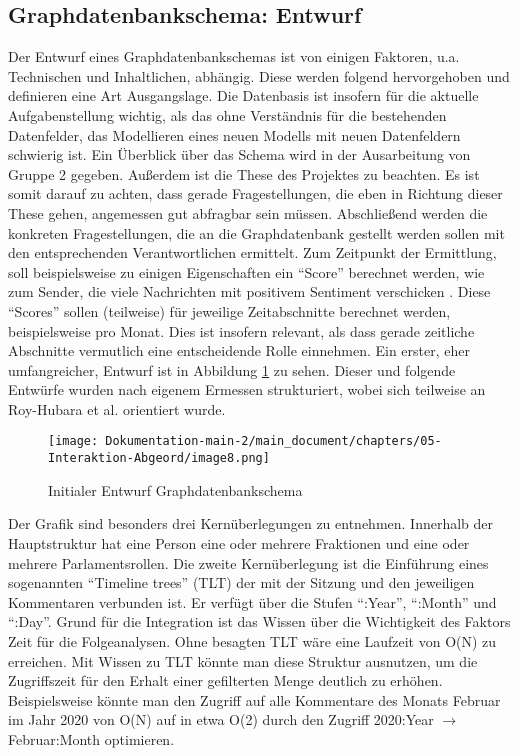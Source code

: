\subsection{Graphdatenbankschema: Entwurf}
Der Entwurf eines Graphdatenbankschemas ist von einigen Faktoren, u.a. Technischen und Inhaltlichen, abhängig. Diese werden folgend hervorgehoben und definieren eine Art Ausgangslage.
\newline
Die Datenbasis ist insofern für die aktuelle Aufgabenstellung wichtig, als das ohne Verständnis für die bestehenden Datenfelder, das Modellieren eines neuen Modells mit neuen Datenfeldern schwierig ist. Ein Überblick über das Schema wird in der Ausarbeitung von Gruppe 2 gegeben.
Außerdem ist die These des Projektes zu beachten. Es ist somit darauf zu achten, dass gerade Fragestellungen, die eben in Richtung dieser These gehen, angemessen gut abfragbar sein müssen.
\newline
Abschließend werden die konkreten Fragestellungen, die an die Graphdatenbank gestellt werden sollen mit den entsprechenden Verantwortlichen ermittelt. Zum Zeitpunkt der Ermittlung, soll beispielsweise zu einigen Eigenschaften ein \enquote{Score} berechnet werden, wie zum Sender, die viele Nachrichten mit positivem Sentiment verschicken \cite{initialQuestionsGroup7}. Diese \enquote{Scores} sollen (teilweise) für jeweilige Zeitabschnitte berechnet werden, beispielsweise pro Monat. Dies ist insofern relevant, als dass gerade zeitliche Abschnitte vermutlich eine entscheidende Rolle einnehmen.
\newline
Ein erster, eher umfangreicher, Entwurf ist in Abbildung \ref{fig:Dokumentation-main-2/muster_for_teams/chapters/04-Abgeordnete/image8.png} zu sehen. Dieser und folgende Entwürfe wurden nach eigenem Ermessen strukturiert, wobei sich teilweise an Roy-Hubara et al. \cite{graphdatabasemodelling} orientiert wurde.
\begin{figure}[hbt!]
    \centering
    \texttt{[image: Dokumentation-main-2/main\_document/chapters/05-Interaktion-Abgeord/image8.png]}
    \caption{Initialer Entwurf Graphdatenbankschema}
    \label{fig:Dokumentation-main-2/muster_for_teams/chapters/04-Abgeordnete/image8.png}
\end{figure}
Der Grafik sind besonders drei Kernüberlegungen zu entnehmen. Innerhalb der Hauptstruktur hat eine Person eine oder mehrere Fraktionen und eine oder mehrere Parlamentsrollen. Die zweite Kernüberlegung ist die Einführung eines sogenannten \enquote{Timeline trees} (TLT) \cite{robinson2015graph} der mit der Sitzung und den jeweiligen Kommentaren verbunden ist. Er verfügt über die Stufen \enquote{:Year}, \enquote{:Month} und \enquote{:Day}. Grund für die Integration ist das Wissen über die Wichtigkeit des Faktors Zeit für die Folgeanalysen. Ohne besagten TLT wäre eine Laufzeit von O(N) zu erreichen. Mit Wissen zu TLT könnte man diese Struktur ausnutzen, um die Zugriffszeit für den Erhalt einer gefilterten Menge deutlich zu erhöhen. Beispielsweise könnte man den Zugriff auf alle Kommentare des Monats Februar im Jahr 2020 von O(N) auf in etwa O(2) durch den Zugriff 2020:Year $\rightarrow$ Februar:Month optimieren.
